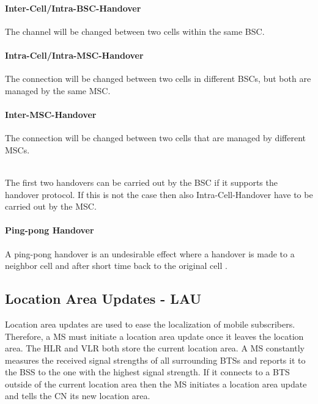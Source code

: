 \documentclass[master,english]{hgbthesis}
\begin{document}
\paragraph{Inter-Cell/Intra-BSC-Handover}

The channel will be changed between two cells within the same BSC.

\paragraph{Intra-Cell/Intra-MSC-Handover}

The connection will be changed between two cells in different BSCs, but both are managed by the same MSC.

\paragraph{Inter-MSC-Handover}

The connection will be changed between two cells that are managed by different MSCs.

\\

The first two handovers can be carried out by the BSC if it supports the handover protocol. If this is not the case then also Intra-Cell-Handover have to be carried out by the MSC.

\paragraph{Ping-pong Handover}

A ping-pong handover is an undesirable effect where a handover is made to a neighbor cell and after short time back to the original cell \cite{Junius1995}.

\subsection{Location Area Updates - LAU}

Location area updates are used to ease the localization of mobile subscribers. Therefore, a MS must initiate a location area update once it leaves the location area. The HLR and VLR both store the current location area. A MS constantly measures the received signal strengths of all surrounding BTSs and reports it to the BSS to the one with the highest signal strength. If it connects to a BTS outside of the current location area then the MS initiates a location area update and tells the CN its new location area.
\end{document}
